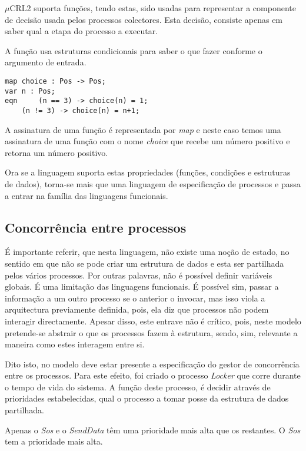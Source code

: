 \documentclass[a4paper,11pt]{article}
\newcommand{\mc}{$\mu$CRL2}
\begin{document}
\mc{} suporta funções, tendo estas, sido usadas para 
representar a componente de decisão usada pelos processos colectores. Esta decisão, consiste apenas em 
saber qual a etapa do processo a executar. \par 
A função usa estruturas condicionais para saber o que fazer conforme o argumento de entrada.

\begin{lstlisting}
map choice : Pos -> Pos;
var n : Pos;
eqn 	(n == 3) -> choice(n) = 1;
	(n != 3) -> choice(n) = n+1;
\end{lstlisting}

A assinatura de uma função é representada por \emph{map} e neste caso 
temos uma assinatura de uma função com o nome \emph{choice} que recebe um número positivo
e retorna um número positivo.\par Ora se a linguagem suporta estas propriedades 
(funções, condições e estruturas de dados),
torna-se mais que uma linguagem de 
especificação de processos e passa a entrar na família das linguagens funcionais. \par 


\subsection{Concorrência entre processos}

É importante referir, que nesta linguagem, não existe uma noção de estado, 
no sentido em que não se pode criar um estrutura de dados e esta ser partilhada
pelos vários processos. Por outras palavras, não é possível definir variáveis globais. É uma 
limitação das linguagens funcionais. É possível sim, 
passar a informação a um outro processo se o anterior o invocar,
mas isso viola a arquitectura previamente definida, pois, ela diz que 
processos não podem interagir directamente.
Apesar disso, este entrave não é crítico, pois, neste modelo 
pretende-se abstrair o que os processos fazem à estrutura, sendo, sim, 
relevante a maneira como estes interagem entre si. \par
Dito isto, no modelo deve estar presente a especificação do gestor de concorrência 
entre os processos. Para este efeito, 
foi criado o processo \emph{Locker} que corre durante o tempo de vida do sistema. 
A função deste processo, é decidir através de prioridades estabelecidas, qual o 
processo a tomar posse da estrutura de dados partilhada. \par 
Apenas o \emph{Sos} e o \emph{SendData} têm uma prioridade mais alta que os restantes. 
O \emph{Sos} tem a prioridade mais alta. \par
\end{document}

